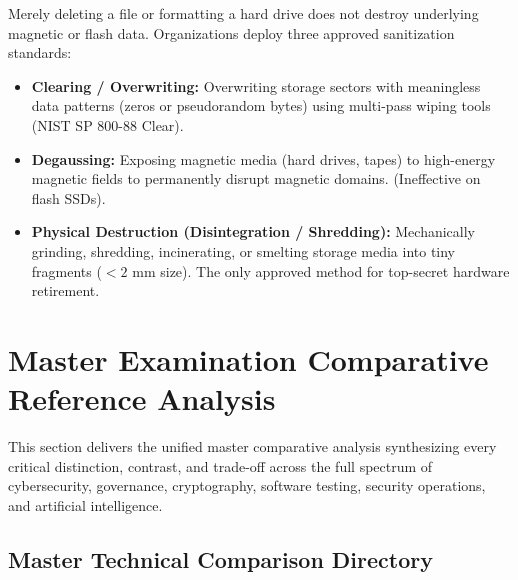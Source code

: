 Merely deleting a file or formatting a hard drive does not destroy underlying magnetic or flash data. Organizations deploy three approved sanitization standards:
\begin{itemize}
\item \textbf{Clearing / Overwriting:} Overwriting storage sectors with meaningless data patterns (zeros or pseudorandom bytes) using multi-pass wiping tools (NIST SP 800-88 Clear).
\item \textbf{Degaussing:} Exposing magnetic media (hard drives, tapes) to high-energy magnetic fields to permanently disrupt magnetic domains. (Ineffective on flash SSDs).
\item \textbf{Physical Destruction (Disintegration / Shredding):} Mechanically grinding, shredding, incinerating, or smelting storage media into tiny fragments ($< 2\text{ mm}$ size). The only approved method for top-secret hardware retirement.
\end{itemize}


\newpage
\section{Master Examination Comparative Reference Analysis}

This section delivers the unified master comparative analysis synthesizing every critical distinction, contrast, and trade-off across the full spectrum of cybersecurity, governance, cryptography, software testing, security operations, and artificial intelligence.

\subsection{Master Technical Comparison Directory}

